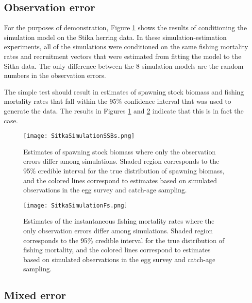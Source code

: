 \documentclass[12pt,letterpaper]{article}
\begin{document}
  \subsection{Observation error} %
  \label{sub:observation_error_only_simulations}
  
   For the purposes of demonstration, Figure \ref{fig.SimulatedSSB} shows the results of conditioning the simulation model on the Stika herring data. In these simulation-estimation experiments, all of the simulations were conditioned on the same fishing mortality rates and recruitment vectors that were estimated from fitting the model to the Sitka data. The only difference between the 8 simulation models are the random numbers in the observation errors.  

   The simple test should result in estimates of spawning stock biomass and fishing mortality rates that fall within the 95\% confidence interval that was used to generate the data.  The results in Figures \ref{fig.SimulatedSSB} and \ref{fig.SimulatedFs} indicate that this is in fact the case. 


  \begin{figure}
    \label{fig.SimulatedSSB}
    \centering
    \texttt{[image: SitkaSimulationSSBs.png]}
    \caption{Estimates of spawning stock biomass where only the observation errors differ among simulations. Shaded region corresponds to the 95\% credible interval for the true distribution of spawning biomass, and the colored lines correspond to estimates based on simulated observations in the egg survey and catch-age sampling.}
  \end{figure}  

  \begin{figure}
    \label{fig.SimulatedFs}
    \centering
    \texttt{[image: SitkaSimulationFs.png]}
    \caption{Estimates of the instantaneous fishing mortality rates where the only observation errors differ among simulations. Shaded region corresponds to the 95\% credible interval for the true distribution of fishing mortality, and the colored lines correspond to estimates based on simulated observations in the egg survey and catch-age sampling.}
  \end{figure}



  \subsection{Mixed error} %
  \label{sub:mixed_error_simulations}
  
\end{document}
